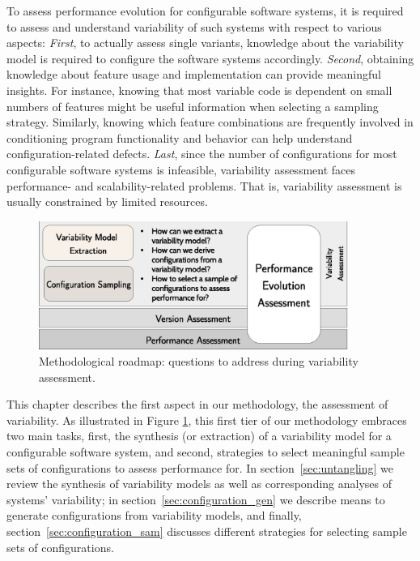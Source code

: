 To assess performance evolution for configurable software systems, it is
required to assess and understand variability of such systems with respect to
various aspects: \emph{First}, to actually assess single variants, knowledge
about the variability model is required to configure the software systems accordingly.
\emph{Second}, obtaining knowledge about feature usage and implementation can
provide meaningful insights. For instance, knowing that most variable code is dependent
on small numbers of features might be useful information when selecting a
sampling strategy. Similarly, knowing which feature combinations are frequently
involved in conditioning program functionality and behavior can help understand
configuration-related defects. \emph{Last}, since the number of configurations
for most configurable software systems is infeasible, variability assessment faces
performance- and scalability-related problems. That is, variability assessment
is usually constrained by limited resources.

\begin{figure}[h!]
	\centering
	\includegraphics[width=0.90\textwidth]{images/process_varassesment.eps}
	\caption{Methodological roadmap: questions to address during variability
	assessment.}
	\label{fig:roadmap_1}
\end{figure}
 
This chapter describes the first aspect in our methodology, the assessment of
variability. As illustrated in Figure \ref{fig:roadmap_1}, this first tier of
our methodology embraces two main tasks, first, the synthesis (or extraction) of a variability model for a configurable software system, and second, strategies to select
meaningful sample sets of configurations to assess performance for. In
section~\ref{sec:untangling} we review the synthesis of variability models as
well as corresponding analyses of systems’ variability; in
section~\ref{sec:configuration_gen} we describe means to generate configurations from variability models, and finally,
section~\ref{sec:configuration_sam} discusses different strategies for selecting
sample sets of configurations.

